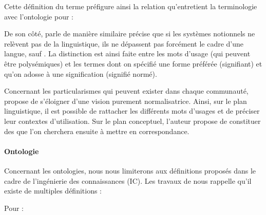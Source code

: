 Cette définition du terme préfigure ainsi la relation qu'entretient la terminologie avec l'ontologie pour \cite{bachimont:icc} : 


De son côté, \cite[\S 2.4]{Roche2005} parle de manière similaire 
\citeauthor{Roche2005} précise que si les systèmes notionnels ne relèvent pas de la linguistique, ils ne dépassent pas forcément le cadre d'une langue, sauf .
La distinction est ainsi faite entre les mots d'usage (qui peuvent être polysémiques) et les termes dont on spécifié une forme préférée (signifiant) et qu'on adosse à une signification (signifié normé).  

Concernant les particularismes qui peuvent exister dans chaque communauté, \citeauthor{Roche2005} propose de s'éloigner d'une vision purement normalisatrice. 
Ainsi, sur le plan linguistique, il est possible de rattacher les différents mots d'usages et de préciser leur contextes d'utilisation.
Sur le plan conceptuel, l'auteur propose de constituer des  que l'on cherchera ensuite à mettre en correspondance. 




\paragraph{Ontologie}
Concernant les ontologies, nous nous limiterons aux définitions proposés dans le cadre de l'ingénierie des connaissances (IC). Les travaux de \cite{Charlet2002} nous rappelle qu'il existe de multiples définitions : 

Pour \cite{Gruber1993} : 


